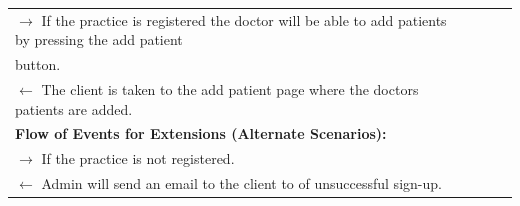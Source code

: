 \documentclass[a4paper]{article}
\begin{document}
\begin{table}[h!]
\begin{tabular}{|c|llll}
\multicolumn{1}{|l|}{ $ \rightarrow $ If the practice is registered the doctor will be able to add patients by pressing the add patient } &  &  &  &  \\

\multicolumn{1}{|l|}{button.} &  &  &  &  \\

\multicolumn{1}{|l|}{ $ \leftarrow $ The client is taken to the add patient page where the doctors patients are added.} &  &  &  &  \\

\multicolumn{1}{|l|}{\textbf{Flow of Events for Extensions (Alternate Scenarios):}} &  &  &  &  \\

\multicolumn{1}{|l|}{ $ \rightarrow $ If the practice is not registered.} &  &  &  &  \\

\multicolumn{1}{|l|}{ $ \leftarrow $ Admin will send an email to the client to of unsuccessful sign-up.} &  &  &  &  \\ \cline{1-1}

\end{tabular}
\end{table}

\FloatBarrier
\end{document}
